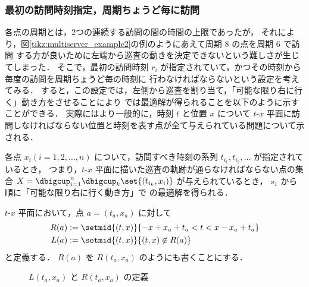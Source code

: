 \subsubsection{最初の訪問時刻指定，周期ちょうど毎に訪問}

各点の周期とは，2つの連続する訪問の間の時間の上限であったが，
それにより，図\ref{tikz:multiserver_example2}の例のようにあえて周期 $8$ の点を周期 $6$ で訪問
する方が良いために左端から巡査の動きを決定できないという難しさが生じてしまった．
そこで，最初の訪問時刻 $r_i$ が指定されていて，かつその時刻から毎度の訪問を周期ちょうど毎の時刻に
行わなければならないという設定を考えてみる．
すると，この設定では，左側から巡査を割り当て，「可能な限り右に行く」動き方をさせることにより
\minpatroller では最適解が得られることを以下のように示すことができる．
実際にはより一般的に，時刻 $t$ と位置 $x$ について
$t$-$x$ 平面に訪問しなければならない位置と時刻を表す点が全て与えられている問題について示される．


\begin{theo}
	\label{theo:xt_decided_1}
	各点 $x_i ( i = 1,2,\ldots,n)$ について，訪問すべき時刻の系列
	$t_{i_1},t_{i_2}, \ldots$ が指定されているとき，
	つまり，$t$-$x$ 平面に描いた巡査の軌跡が通らなければならない点の集合
	$X = \dbigcup_{i = 1}^n \dbigcup_k \set{(t_{i_k}, x_i)}$
	が与えられているとき，
	$s_1$ から順に「可能な限り右に行く動き方」で \minpatroller の最適解を得られる．
\end{theo}



\begin{defi}
	$t$-$x$ 平面において，点 $a = (t_a,x_a)$ に対して
	\begin{alignat*}{3}
	R(a)
	&:= \setmid{(t,x)}{ -x + x_a + t_a < t < x - x_a + t_a } \\
	L(a)
	&:= \setmid{(t,x)}{ (t,x) \not\in R(a) }
	\end{alignat*}
	と定義する．
	$R(a)$ を $R(t_a,x_a)$ のようにも書くことにする．


\begin{figure}[h]
	\centering
	\caption{$L(t_a,x_a)$ と $R(t_a,x_a)$ の定義 \label{tikz:defLR}}
\end{figure}

\end{defi}


